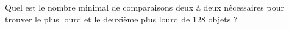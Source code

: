 Quel est le nombre minimal de comparaisons deux à deux nécessaires pour trouver le plus lourd et le deuxième plus lourd de $128$ objets ?

